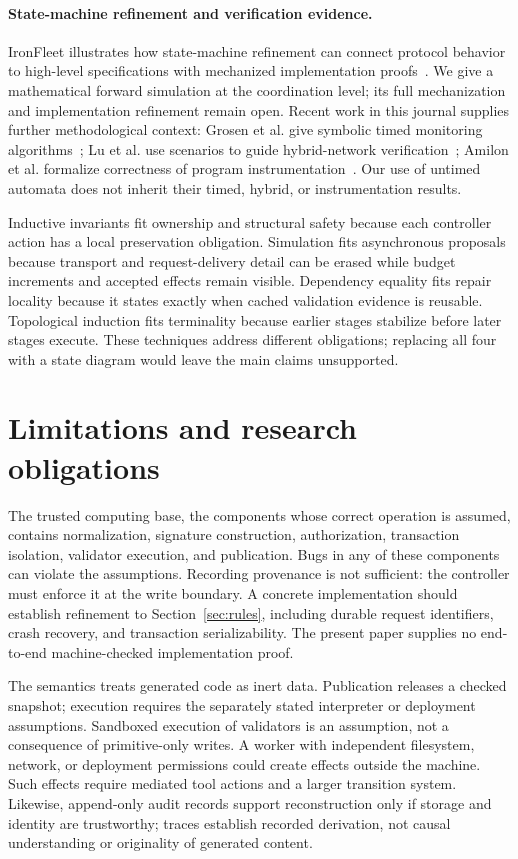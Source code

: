\documentclass[pdflatex,sn-mathphys-num]{sn-jnl}
\theoremstyle{thmstyleone}
\theoremstyle{thmstylethree}
\theoremstyle{thmstyletwo}
\begin{document}
\paragraph{State-machine refinement and verification evidence.} IronFleet illustrates how state-machine refinement can connect protocol behavior to high-level specifications with mechanized implementation proofs~\cite{ironfleet}. We give a mathematical forward simulation at the coordination level; its full mechanization and implementation refinement remain open. Recent work in this journal supplies further methodological context: Grosen et al. give symbolic timed monitoring algorithms~\cite{grosen}; Lu et al. use scenarios to guide hybrid-network verification~\cite{lu}; Amilon et al. formalize correctness of program instrumentation~\cite{amilon}. Our use of untimed automata does not inherit their timed, hybrid, or instrumentation results.

Inductive invariants fit ownership and structural safety because each controller action has a local preservation obligation. Simulation fits asynchronous proposals because transport and request-delivery detail can be erased while budget increments and accepted effects remain visible. Dependency equality fits repair locality because it states exactly when cached validation evidence is reusable. Topological induction fits terminality because earlier stages stabilize before later stages execute. These techniques address different obligations; replacing all four with a state diagram would leave the main claims unsupported.

\section{Limitations and research obligations}\label{sec:limitations}
The trusted computing base, the components whose correct operation is assumed, contains normalization, signature construction, authorization, transaction isolation, validator execution, and publication. Bugs in any of these components can violate the assumptions. Recording provenance is not sufficient: the controller must enforce it at the write boundary. A concrete implementation should establish refinement to Section~\ref{sec:rules}, including durable request identifiers, crash recovery, and transaction serializability. The present paper supplies no end-to-end machine-checked implementation proof.

The semantics treats generated code as inert data. Publication releases a checked snapshot; execution requires the separately stated interpreter or deployment assumptions. Sandboxed execution of validators is an assumption, not a consequence of primitive-only writes. A worker with independent filesystem, network, or deployment permissions could create effects outside the machine. Such effects require mediated tool actions and a larger transition system. Likewise, append-only audit records support reconstruction only if storage and identity are trustworthy; traces establish recorded derivation, not causal understanding or originality of generated content.
\end{document}
